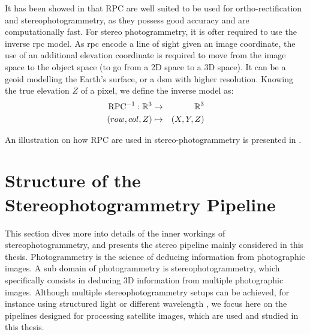 It has been showed in \cite{baltsavias_metric_1992} that RPC are well suited to be used for ortho-rectification and stereophotogrammetry, as they possess good accuracy and are computationally fast. For stereo photogrammetry, it is ofter required to use the inverse \acrshort{rpc} model. As \acrshort{rpc} encode a line of sight given an image coordinate, the use of an additional elevation coordinate is required to move from the image space to the object space (\ie to go from a 2D space to a 3D space). It can be a geoid modelling the Earth's surface, or a \acrshort{dsm} with higher resolution. Knowing the true elevation $Z$ of a pixel, we define the inverse model as:
\begin{eqnarray}
    \mathrm{RPC}^{-1}:\mathbb{R}^3 &\rightarrow&\mathbb{R}^3\nonumber\\
    (row, col, Z) 	&\mapsto& (X,Y,Z) \label{eq:inverse_rpc}
\end{eqnarray}

An illustration on how RPC are used in stereo-photogrammetry is presented in . 

\section{Structure of the Stereophotogrammetry Pipeline}\label{sec:classical_stero_pipeline}
This section dives more into details of the inner workings of stereophotogrammetry, and presents the stereo pipeline mainly considered in this thesis. Photogrammetry is the science of deducing information from photographic images. A sub domain of photogrammetry is stereophotogrammetry, which specifically consists in deducing 3D information from multiple photographic images. Although multiple stereophotogrammetry setups can be achieved, for instance using structured light \cite{scharstein_high-accuracy_2003} or different wavelength \cite{geng_rainbow_1996}, we focus here on the pipelines designed for processing satellite images, which are used and studied in this thesis. 

